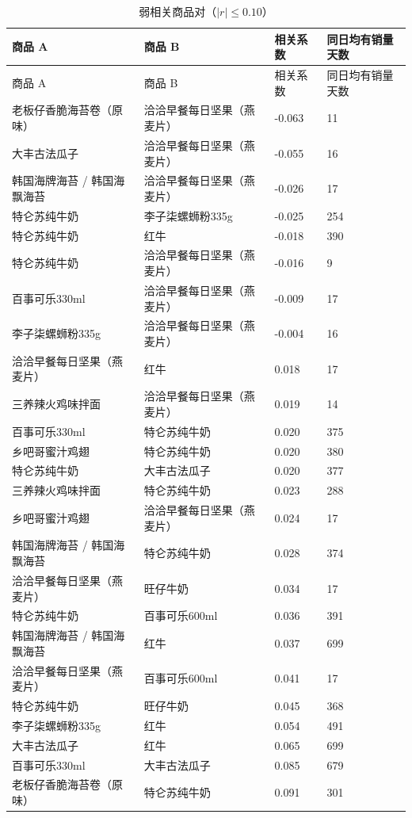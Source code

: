 \begingroup
\small
\setlength{\tabcolsep}{4pt}
\begin{longtable}{p{4.4cm}p{4.6cm}p{1.7cm}p{2.0cm}}
\caption{弱相关商品对（$|r|\le 0.10$）}
\label{tab:q2_weak_pairs}\\
\toprule
商品 A & 商品 B & 相关系数 & 同日均有销量天数 \\
\midrule
\endfirsthead
\toprule
商品 A & 商品 B & 相关系数 & 同日均有销量天数 \\
\midrule
\endhead
老板仔香脆海苔卷（原味） & 洽洽早餐每日坚果（燕麦片） & -0.063 & 11 \\
大丰古法瓜子 & 洽洽早餐每日坚果（燕麦片） & -0.055 & 16 \\
韩国海牌海苔 / 韩国海飘海苔 & 洽洽早餐每日坚果（燕麦片） & -0.026 & 17 \\
特仑苏纯牛奶 & 李子柒螺蛳粉335g & -0.025 & 254 \\
特仑苏纯牛奶 & 红牛 & -0.018 & 390 \\
特仑苏纯牛奶 & 洽洽早餐每日坚果（燕麦片） & -0.016 & 9 \\
百事可乐330ml & 洽洽早餐每日坚果（燕麦片） & -0.009 & 17 \\
李子柒螺蛳粉335g & 洽洽早餐每日坚果（燕麦片） & -0.004 & 16 \\
洽洽早餐每日坚果（燕麦片） & 红牛 & 0.018 & 17 \\
三养辣火鸡味拌面 & 洽洽早餐每日坚果（燕麦片） & 0.019 & 14 \\
百事可乐330ml & 特仑苏纯牛奶 & 0.020 & 375 \\
乡吧哥蜜汁鸡翅 & 特仑苏纯牛奶 & 0.020 & 380 \\
特仑苏纯牛奶 & 大丰古法瓜子 & 0.020 & 377 \\
三养辣火鸡味拌面 & 特仑苏纯牛奶 & 0.023 & 288 \\
乡吧哥蜜汁鸡翅 & 洽洽早餐每日坚果（燕麦片） & 0.024 & 17 \\
韩国海牌海苔 / 韩国海飘海苔 & 特仑苏纯牛奶 & 0.028 & 374 \\
洽洽早餐每日坚果（燕麦片） & 旺仔牛奶 & 0.034 & 17 \\
特仑苏纯牛奶 & 百事可乐600ml & 0.036 & 391 \\
韩国海牌海苔 / 韩国海飘海苔 & 红牛 & 0.037 & 699 \\
洽洽早餐每日坚果（燕麦片） & 百事可乐600ml & 0.041 & 17 \\
特仑苏纯牛奶 & 旺仔牛奶 & 0.045 & 368 \\
李子柒螺蛳粉335g & 红牛 & 0.054 & 491 \\
大丰古法瓜子 & 红牛 & 0.065 & 699 \\
百事可乐330ml & 大丰古法瓜子 & 0.085 & 679 \\
老板仔香脆海苔卷（原味） & 特仑苏纯牛奶 & 0.091 & 301 \\
\bottomrule
\end{longtable}
\endgroup

